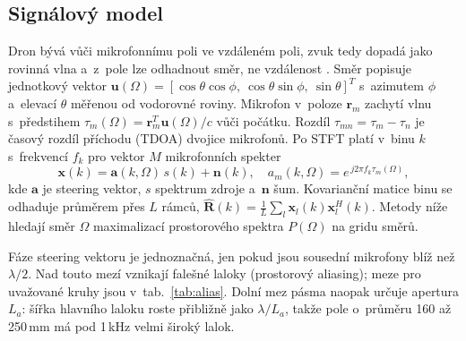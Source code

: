 \documentclass[conference]{IEEEtran}
\begin{document}
\subsection{Signálový model}
Dron bývá vůči mikrofonnímu poli ve vzdáleném poli, zvuk tedy dopadá jako rovinná vlna a~z~pole lze odhadnout směr, ne vzdálenost \cite{altena2025frequency}. Směr popisuje jednotkový vektor $\mathbf{u}(\Omega)=[\cos\theta\cos\phi,\ \cos\theta\sin\phi,\ \sin\theta]^T$ s~azimutem $\phi$ a~elevací $\theta$ měřenou od vodorovné roviny. Mikrofon v~poloze $\mathbf{r}_m$ zachytí vlnu s~předstihem $\tau_m(\Omega)=\mathbf{r}_m^T\mathbf{u}(\Omega)/c$ vůči počátku. Rozdíl $\tau_{mn}=\tau_m-\tau_n$ je časový rozdíl příchodu (TDOA) dvojice mikrofonů. Po STFT platí v~binu $k$ s~frekvencí $f_k$ pro vektor $M$ mikrofonních spekter
\begin{equation}
  \mathbf{x}(k) = \mathbf{a}(k,\Omega)\,s(k) + \mathbf{n}(k), \quad a_m(k,\Omega) = e^{\,j2\pi f_k \tau_m(\Omega)},
  \label{eq:model}
\end{equation}
kde $\mathbf{a}$ je steering vektor, $s$ spektrum zdroje a~$\mathbf{n}$ šum. Kovarianční matice binu se odhaduje průměrem přes $L$ rámců, $\hat{\mathbf{R}}(k)=\frac{1}{L}\sum_l \mathbf{x}_l(k)\mathbf{x}_l^H(k)$. Metody níže hledají směr $\Omega$ maximalizací prostorového spektra $P(\Omega)$ na gridu směrů.

Fáze steering vektoru je jednoznačná, jen pokud jsou sousední mikrofony blíž než $\lambda/2$. Nad touto mezí vznikají falešné laloky (prostorový aliasing); meze pro uvažované kruhy jsou v~tab.~\ref{tab:alias}. Dolní mez pásma naopak určuje apertura $L_a$: šířka hlavního laloku roste přibližně jako $\lambda/L_a$, takže pole o~průměru 160 až 250\,mm má pod 1\,kHz velmi široký lalok.
\end{document}
